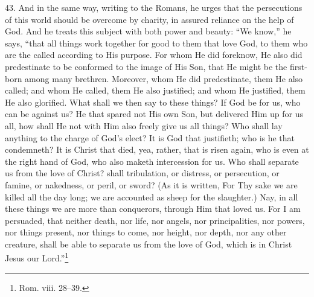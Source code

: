 43. And in the same way, writing to the Romans, he urges that the persecutions of this world should be overcome by charity, in assured reliance on the help of God. And he treats this subject with both power and beauty: “We know,” he says, “that all things work together for good to them that love God, to them who are the called according to His purpose. For whom He did foreknow, He also did predestinate to be conformed to the image of His Son, that He might be the first-born among many brethren. Moreover, whom He did predestinate, them He also called; and whom He called, them He also justified; and whom He justified, them He also glorified. What shall we then say to these things? If God be for us, who can be against us? He that spared not His own Son, but delivered Him up for us all, how shall He not with Him also freely give us all things? Who shall lay anything to the charge of God’s elect? It is God that justifieth; who is he that condemneth? It is Christ that died, yea, rather, that is risen again, who is even at the right hand of God, who also maketh intercession for us. Who shall separate us from the love of Christ? shall tribulation, or distress, or persecution, or famine, or nakedness, or peril, or sword? (As it is written, For Thy sake we are killed all the  day long; we are accounted as sheep for the slaughter.) Nay, in all these things we are more than conquerors, through Him that loved us. For I am persuaded, that neither death, nor life, nor angels, nor principalities, nor powers, nor things present, nor things to come, nor height, nor depth, nor any other creature, shall be able to separate us from the love of God, which is in Christ Jesus our Lord.”\footnote{Rom. viii. 28–39.}

